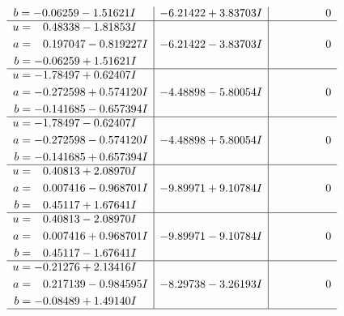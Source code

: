 \documentclass[1p]{elsarticle_modified}
\theoremstyle{definition}
\begin{document}
$$\begin{array}{c|c|c}
\begin{aligned}
b &= -0.06259 - 1.51621 I\end{aligned}
 & -6.21422 + 3.83703 I & \phantom{-0.000000 } 0 \\ \hline\begin{aligned}
u &= \phantom{-}0.48338 - 1.81853 I \\
a &= \phantom{-}0.197047 - 0.819227 I \\
b &= -0.06259 + 1.51621 I\end{aligned}
 & -6.21422 - 3.83703 I & \phantom{-0.000000 } 0 \\ \hline\begin{aligned}
u &= -1.78497 + 0.62407 I \\
a &= -0.272598 + 0.574120 I \\
b &= -0.141685 - 0.657394 I\end{aligned}
 & -4.48898 - 5.80054 I & \phantom{-0.000000 } 0 \\ \hline\begin{aligned}
u &= -1.78497 - 0.62407 I \\
a &= -0.272598 - 0.574120 I \\
b &= -0.141685 + 0.657394 I\end{aligned}
 & -4.48898 + 5.80054 I & \phantom{-0.000000 } 0 \\ \hline\begin{aligned}
u &= \phantom{-}0.40813 + 2.08970 I \\
a &= \phantom{-}0.007416 - 0.968701 I \\
b &= \phantom{-}0.45117 + 1.67641 I\end{aligned}
 & -9.89971 + 9.10784 I & \phantom{-0.000000 } 0 \\ \hline\begin{aligned}
u &= \phantom{-}0.40813 - 2.08970 I \\
a &= \phantom{-}0.007416 + 0.968701 I \\
b &= \phantom{-}0.45117 - 1.67641 I\end{aligned}
 & -9.89971 - 9.10784 I & \phantom{-0.000000 } 0 \\ \hline\begin{aligned}
u &= -0.21276 + 2.13416 I \\
a &= \phantom{-}0.217139 - 0.984595 I \\
b &= -0.08489 + 1.49140 I\end{aligned}
 & -8.29738 - 3.26193 I & \phantom{-0.000000 } 0\\
 \hline 
 \end{array}$$\newpage$$\begin{array}{c|c|c}  

\end{array}$$
\end{document}
